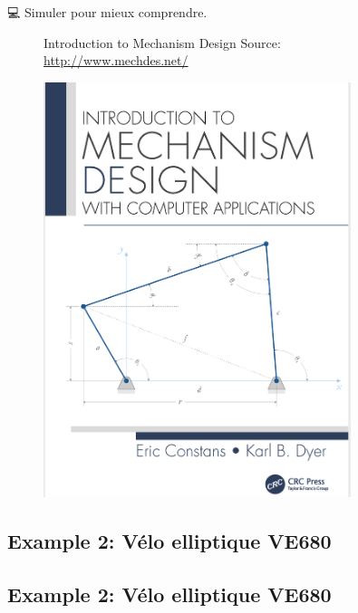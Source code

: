 \documentclass[
  ignorenonframetext,
  aspectratio=169,
  c]{beamer}
\begin{document}
\begin{frame}{💻 Simuler pour mieux comprendre.}
\begin{figure}

\begin{minipage}{0.56\linewidth}
Introduction to Mechanism Design Source:
\url{http://www.mechdes.net/}\end{minipage}%
%
\begin{minipage}{0.44\linewidth}
\begin{center}
\includegraphics[width=0.8\textwidth,height=\textheight]{CM3/Mechanism-design.png}
\end{center}
\end{minipage}%

\end{figure}%
\end{frame}

\subsection{Example 2: Vélo elliptique
VE680}\label{example-2-vuxe9lo-elliptique-ve680}

\subsection{Example 2: Vélo elliptique
VE680}\label{example-2-vuxe9lo-elliptique-ve680-1}
\end{document}
